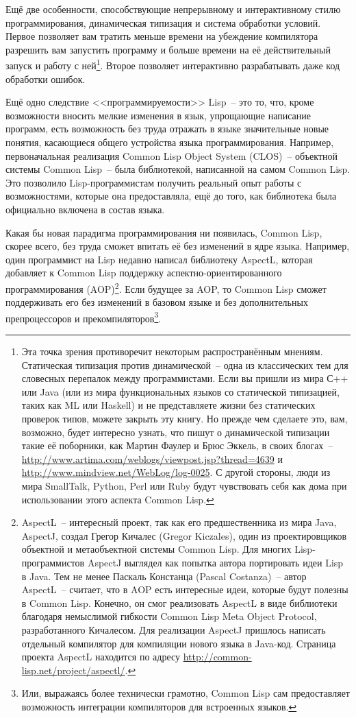 Ещё две особенности, способствующие непрерывному и интерактивному стилю
программирования, динамическая типизация и система обработки условий.
Первое позволяет вам тратить меньше времени на убеждение компилятора разрешить вам
запустить программу и больше времени на её действительный запуск и работу с
ней\footnote{Эта точка зрения противоречит некоторым распространённым мнениям. Статическая
  типизация против динамической~-- одна из классических тем для словесных перепалок между
  программистами. Если вы пришли из мира С++ или Java (или из мира функциональных языков
  со статической типизацией, таких как ML или Haskell) и не представляете жизни без
  статических проверок типов, можете закрыть эту книгу.  Но прежде чем сделаете это,
  вам, возможно, будет интересно узнать, что пишут о динамической типизации такие её
  поборники, как Мартин Фаулер и Брюс Эккель, в своих блогах~--
 \url{http://www.artima.com/weblogs/viewpost.jsp?thread=4639} 
  и
  \url{http://www.mindview.net/WebLog/log-0025}.
  С другой стороны, люди из мира
  SmallTalk, Python, Perl или Ruby будут чувствовать себя как дома при использовании этого аспекта Common Lisp.}. Второе позволяет
интерактивно разрабатывать даже код обработки ошибок.

Ещё одно следствие <<программируемости>> Lisp~-- это то, что, кроме
возможности вносить мелкие изменения в язык, упрощающие написание программ,
есть возможность без труда отражать в языке значительные новые понятия, касающиеся общего
устройства языка программирования. Например, первоначальная реализация Common Lisp Object
System (CLOS)~-- объектной системы Common Lisp~-- была библиотекой, написанной на самом
Common Lisp. Это позволило Lisp-программистам получить реальный опыт работы с
возможностями, которые она предоставляла, ещё до того, как библиотека была
официально включена в состав языка.

Какая бы новая парадигма программирования ни появилась, Common Lisp, скорее всего, без
труда сможет впитать её без изменений в ядре языка. Например, один программист на Lisp
недавно написал библиотеку AspectL, которая добавляет к Common Lisp поддержку
аспектно-ориентированного программирования (AOP)\footnote{AspectL~-- интересный проект,
  так как его предшественника из мира Java, AspectJ, создал Грегор Кичалес (Gregor
  Kiczales), один из проектировщиков объектной и метаобъектной системы Common Lisp. Для
  многих Lisp-программистов AspectJ выглядел как попытка автора портировать идеи Lisp в
  Java. Тем не менее Паскаль Констанца (Pascal Costanza)~-- автор AspectL~-- считает, что
  в AOP есть интересные идеи, которые будут полезны в Common Lisp. Конечно, он смог
  реализовать AspectL в виде библиотеки благодаря немыслимой гибкости Common Lisp Meta
  Object Protocol, разработанного Кичалесом. Для реализации AspectJ пришлось написать
  отдельный компилятор для компиляции нового языка в Java-код. Страница проекта AspectL
  находится по адресу \url{http://common-lisp.net/project/aspectl/}.}. Если будущее за
AOP, то Common Lisp сможет поддерживать его без изменений в базовом языке и без
дополнительных препроцессоров и прекомпиляторов\footnote{Или, выражаясь более технически
  грамотно, Common Lisp сам предоставляет возможность интеграции компиляторов
  для встроенных языков.}.

